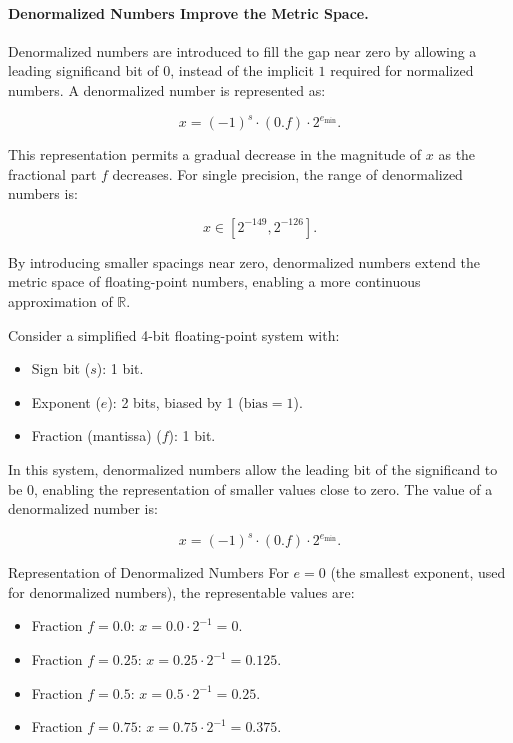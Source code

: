 \paragraph{Denormalized Numbers Improve the Metric Space.}
Denormalized numbers are introduced to fill the gap near zero by allowing a leading significand bit of \( 0 \), instead of the implicit \( 1 \) required for normalized numbers. A denormalized number is represented as:

\[
x = (-1)^s \cdot (0.f) \cdot 2^{e_{\text{min}}}.
\]

This representation permits a gradual decrease in the magnitude of \( x \) as the fractional part \( f \) decreases. For single precision, the range of denormalized numbers is:

\[
x \in \left[ 2^{-149}, 2^{-126} \right].
\]

By introducing smaller spacings near zero, denormalized numbers extend the metric space of floating-point numbers, enabling a more continuous approximation of \( \mathbb{R} \).

Consider a simplified 4-bit floating-point system with:
\begin{itemize}
    \item Sign bit (\( s \)): 1 bit.
    \item Exponent (\( e \)): 2 bits, biased by 1 (\( \text{bias} = 1 \)).
    \item Fraction (mantissa) (\( f \)): 1 bit.
\end{itemize}

In this system, denormalized numbers allow the leading bit of the significand to be \( 0 \), enabling the representation of smaller values close to zero. The value of a denormalized number is:

\[
x = (-1)^s \cdot (0.f) \cdot 2^{e_{\text{min}}}.
\]

Representation of Denormalized Numbers
For \( e = 0 \) (the smallest exponent, used for denormalized numbers), the representable values are:

\begin{itemize}
    \item Fraction \( f = 0.0 \):
    \(
    x = 0.0 \cdot 2^{-1} = 0.
    \)

    \item Fraction \( f = 0.25 \):
    \(
    x = 0.25 \cdot 2^{-1} = 0.125.
    \)

    \item Fraction \( f = 0.5 \):
    \(
    x = 0.5 \cdot 2^{-1} = 0.25.
    \)

    \item Fraction \( f = 0.75 \):
    \(
    x = 0.75 \cdot 2^{-1} = 0.375.
    \)
\end{itemize}

